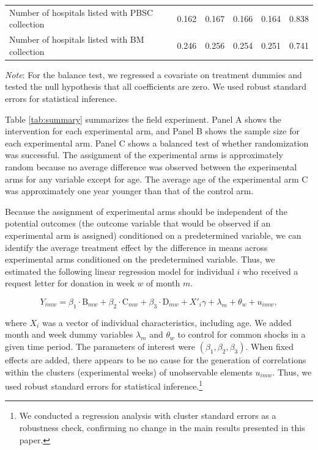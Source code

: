 \documentclass[12pt, a4paper]{article}
\begin{document}
\begin{table}
\begin{threeparttable}
\begin{tabular}[t]{lccccc}
\hspace{1em}Number of hospitals listed with PBSC collection & 0.162 & 0.167 & 0.166 & 0.164 & 0.838\\
\hspace{1em}Number of hospitals listed with BM collection & 0.246 & 0.256 & 0.254 & 0.251 & 0.741\\
\bottomrule
\end{tabular}
\begin{tablenotes}
\item \emph{Note}: For the balance test, we regressed a covariate on treatment dummies and tested the null hypothesis that all coefficients are zero. We used robust standard errors for statistical inference.
\end{tablenotes}
\end{threeparttable}
\end{table}

Table \ref{tab:summary} summarizes the field experiment. Panel A shows the intervention for each experimental arm, and Panel B shows the sample size for each experimental arm. Panel C shows a balanced test of whether randomization was successful. The assignment of the experimental arms is approximately random because no average difference was observed between the experimental arms for any variable except for age. The average age of the experimental arm C was approximately one year younger than that of the control arm.

Because the assignment of experimental arms should be independent of the potential outcomes (the outcome variable that would be observed if an experimental arm is assigned) conditioned on a predetermined variable, we can identify the average treatment effect by the difference in means across experimental arms conditioned on the predetermined variable. Thus, we estimated the following linear regression model for individual \(i\) who received a request letter for donation in week \(w\) of month \(m\).

\begin{equation}
  Y_{imw} =
  \beta_1 \cdot \text{B}_{mw} + \beta_2 \cdot \text{C}_{mw} + \beta_3 \cdot \text{D}_{mw}
  + X'_i \gamma + \lambda_m + \theta_w + u_{imw}, \label{eq:reg}
\end{equation}

\noindent
where \(X_i\) was a vector of individual characteristics, including age. We added month and week dummy variables \(\lambda_m\) and \(\theta_w\) to control for common shocks in a given time period. The parameters of interest were \((\beta_1, \beta_2, \beta_3)\). When fixed effects are added, there appears to be no cause for the generation of correlations within the clusters (experimental weeks) of unobservable elements \(u_{imw}\). Thus, we used robust standard errors for statistical inference.\footnote{We conducted a regression analysis with cluster standard errors as a robustness check, confirming no change in the main results presented in this paper.}
\end{document}
